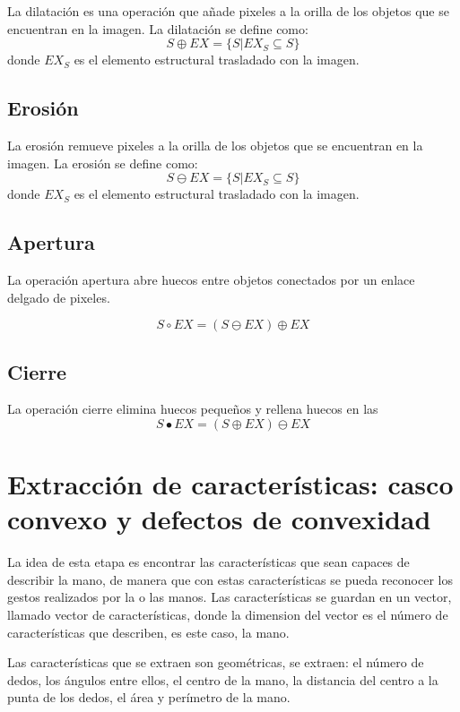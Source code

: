 La dilatación es una operación que añade pixeles a la orilla de los objetos que se encuentran en la imagen. La dilatación se define como:  
$$S \oplus EX = \lbrace S|EX_S \subseteq S \rbrace$$  
donde $EX_S$ es el elemento estructural trasladado con la imagen. 

\subsection{Erosión}\label{OMerosion}

La erosión remueve pixeles a la orilla de los objetos que se encuentran en la imagen. La erosión se define como: 
$$S \ominus EX = \lbrace S|EX_S \subseteq S \rbrace$$ 
donde $EX_S$ es el elemento estructural trasladado con la imagen. 

\subsection{Apertura}\label{Opening} 

La operación apertura abre huecos entre objetos conectados por un enlace delgado de pixeles.  

$$S \circ EX = (S \ominus EX) \oplus EX $$

\subsection{Cierre}\label{Closure}

La operación cierre elimina huecos pequeños  y rellena huecos en las
$$S \bullet EX = (S \oplus EX) \ominus EX $$

\section{Extracción de características: casco convexo y defectos de convexidad}\label{sec:Convexhull} 

La idea de esta etapa es encontrar las características que sean capaces de describir la mano, de manera que con estas características se pueda reconocer los gestos realizados por la o las manos.  
Las características se guardan en un vector, llamado vector de características, donde la dimension del vector es el número de características que describen, es este caso, la mano.  

Las características que se extraen son geométricas, se extraen: el n\'umero de dedos, los ángulos entre ellos, el centro de la mano, la distancia del centro a la punta de los dedos, el área y perímetro de la mano. 

